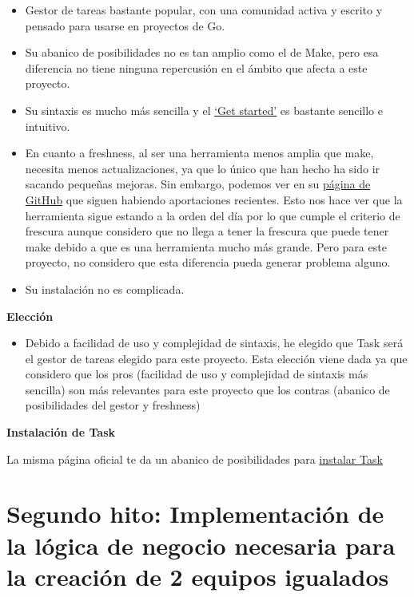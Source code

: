 \begin{itemize}
\item
  Gestor de tareas bastante popular, con una comunidad activa y escrito
  y pensado para usarse en proyectos de Go.
\item
  Su abanico de posibilidades no es tan amplio como el de Make, pero esa
  diferencia no tiene ninguna repercusión en el ámbito que afecta a este
  proyecto.
\item
  Su sintaxis es mucho más sencilla y el
  \href{https://taskfile.dev/usage/}{`Get started'} es bastante sencillo
  e intuitivo.
\item
  En cuanto a freshness, al ser una herramienta menos amplia que make,
  necesita menos actualizaciones, ya que lo único que han hecho ha sido
  ir sacando pequeñas mejoras. Sin embargo, podemos ver en su
  \href{https://github.com/go-task/task}{página de GitHub} que siguen
  habiendo aportaciones recientes. Esto nos hace ver que la herramienta
  sigue estando a la orden del día por lo que cumple el criterio de
  frescura aunque considero que no llega a tener la frescura que puede
  tener make debido a que es una herramienta mucho más grande. Pero para
  este proyecto, no considero que esta diferencia pueda generar problema
  alguno.
\item
  Su instalación no es complicada.
\end{itemize}


\textbf{Elección}

\begin{itemize}
\item
  Debido a facilidad de uso y complejidad de sintaxis, he elegido que
  Task será el gestor de tareas elegido para este proyecto. Esta
  elección viene dada ya que considero que los pros (facilidad de uso y
  complejidad de sintaxis más sencilla) son más relevantes para este
  proyecto que los contras (abanico de posibilidades del gestor y
  freshness)
\end{itemize}

\textbf{Instalación de Task}

La misma página oficial te da un abanico de posibilidades para
\href{https://taskfile.dev/installation/}{instalar Task}

\newpage
\section{Segundo hito: Implementación de la lógica de negocio necesaria para la creación de 2 equipos igualados}

